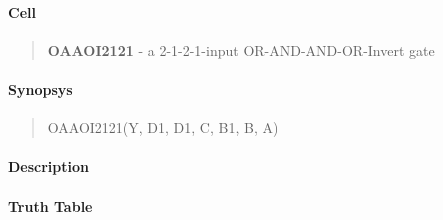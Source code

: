 \label{OAAOI2121}
\paragraph{Cell}
\begin{quote}
    \textbf{OAAOI2121} - a 2-1-2-1-input OR-AND-AND-OR-Invert gate
\end{quote}

\paragraph{Synopsys}
\begin{quote}
    OAAOI2121(Y, D1, D1, C, B1, B, A)
\end{quote}

\paragraph{Description}

%

\paragraph{Truth Table}
%

